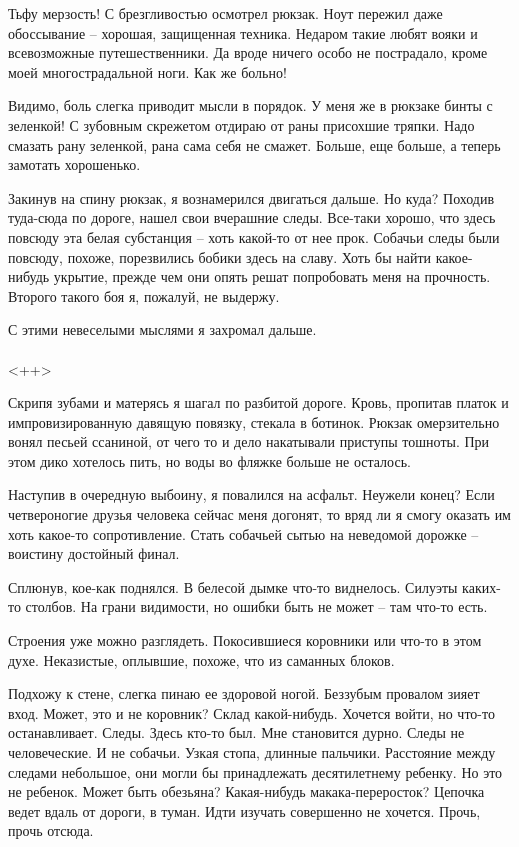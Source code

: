 \documentclass[a4paper]{book}
\begin{document}
Тьфу мерзость! С брезгливостью осмотрел рюкзак. Ноут пережил даже обоссывание -- хорошая, защищенная техника. Недаром такие любят вояки и всевозможные путешественники. Да вроде ничего особо не пострадало, кроме моей многострадальной ноги. Как же больно! 

Видимо, боль слегка приводит мысли в порядок. У меня же в рюкзаке бинты с зеленкой! С зубовным скрежетом отдираю от раны присохшие тряпки. Надо смазать рану зеленкой, рана сама себя не смажет. Больше, еще больше, а теперь замотать хорошенько.

Закинув на спину рюкзак, я вознамерился двигаться дальше. Но куда? Походив туда-сюда по дороге, нашел свои вчерашние следы. Все-таки хорошо, что здесь повсюду эта белая субстанция -- хоть какой-то от нее прок. Собачьи следы были повсюду, похоже, порезвились бобики здесь на славу. Хоть бы найти какое-нибудь укрытие, прежде чем они опять решат попробовать меня на прочность. Второго такого боя я, пожалуй, не выдержу.

С этими невеселыми мыслями я захромал дальше.
\\
\paragraph{}<++>


Скрипя зубами и матерясь я шагал по разбитой дороге. Кровь, пропитав платок и импровизированную давящую повязку, стекала в ботинок. Рюкзак омерзительно вонял песьей ссаниной, от чего то и дело накатывали приступы тошноты. При этом дико хотелось пить, но воды во фляжке больше не осталось.

Наступив в очередную выбоину, я повалился на асфальт. Неужели конец? Если четвероногие друзья человека сейчас меня догонят, то вряд ли я смогу оказать им хоть какое-то сопротивление. Стать собачьей сытью на неведомой дорожке -- воистину достойный финал. 

Сплюнув, кое-как поднялся. В белесой дымке что-то виднелось. Силуэты каких-то столбов. На грани видимости, но ошибки быть не может -- там что-то есть. 

Строения уже можно разглядеть. Покосившиеся коровники или что-то в этом духе. Неказистые, оплывшие, похоже, что из саманных блоков. 

Подхожу к стене, слегка пинаю ее здоровой ногой. Беззубым провалом зияет вход. Может, это и не коровник? Склад какой-нибудь. Хочется войти, но что-то останавливает. Следы. Здесь кто-то был.  Мне становится дурно. Следы не человеческие. И не собачьи. Узкая стопа, длинные пальчики. Расстояние между следами небольшое, они могли бы принадлежать десятилетнему ребенку. Но это не ребенок. Может быть обезьяна? Какая-нибудь макака-переросток? Цепочка ведет вдаль от дороги, в туман. Идти изучать совершенно не хочется. Прочь, прочь отсюда. 
\end{document}
